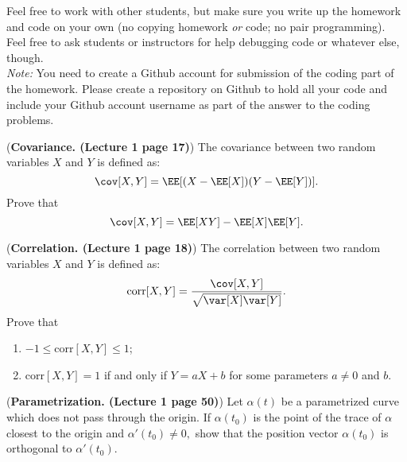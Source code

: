 \documentclass[12pt,letterpaper]{hmcpset}
\begin{document}
Feel free to work with other students, but make sure you write up the homework
and code on your own (no copying homework \textit{or} code; no pair programming).
Feel free to ask students or instructors for help debugging code or whatever else,
though.\\

\textit{Note:} You need to create a Github account for submission of the coding part of the homework. Please create a repository on Github to hold all your code and include your Github account username as part of the answer to the coding problems.

\begin{problem}[1]
(\textbf{Covariance. (Lecture 1 page 17)}) The covariance between two random variables $X$ and $Y$ is defined as:
$$
   \cov[X,Y] = \EE[(X-\EE[X])(Y-\EE[Y])].
$$
Prove that
$$
\cov[X,Y] = \EE[XY]- \EE[X] \EE[Y].
$$
\end{problem}
\begin{solution}
    \vfill
\end{solution}
\newpage




\begin{problem}[2]
(\textbf{Correlation. (Lecture 1 page 18)}) The correlation between two random variables $X$ and $Y$ is defined as:
$$
\text{corr}[X,Y] =\frac{ \cov[X,Y]}{\sqrt{\var[X]\var[Y]}}.
$$
Prove that
\begin{enumerate}
\item $-1\le\text{corr}[X,Y]\le1$;
\item $\text{corr}[X,Y]=1$ if and only if $Y=aX+b$ for some parameters $a\neq 0 $ and $b$.
\end{enumerate}


\end{problem}
\begin{solution}
    \vfill
\end{solution}
\newpage

\begin{problem}[3]
	(\textbf{Parametrization. (Lecture 1 page 50)}) Let $\alpha(t)$ be a parametrized curve which does not pass through the origin. If $\alpha(t_0)$ is the point of the trace of $\alpha$ closest to the origin and $\alpha'(t_0)\neq0,$ show that the position vector $\alpha(t_0)$ is orthogonal to $\alpha'(t_0)$.


\end{problem}
\begin{solution}
	\vfill
\end{solution}
\newpage
\end{document}
